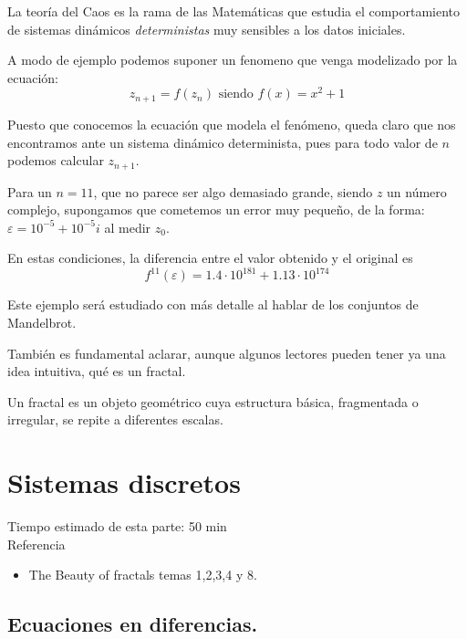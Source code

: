 \begin{definition}
La teoría del Caos es la rama de las Matemáticas que estudia el comportamiento de sistemas dinámicos \emph{deterministas} muy sensibles a los datos iniciales.
\end{definition}



\begin{example}
A modo de ejemplo podemos suponer un fenomeno que venga modelizado por la ecuación:
\[z_{n+1} = f(z_n) \text{ siendo } f(x) = x^2+1\]

Puesto que conocemos la ecuación que modela el fenómeno, queda claro que nos encontramos ante un sistema dinámico determinista, pues para todo valor de $n$ podemos calcular $z_{n+1}$.

Para un $n=11$, que no parece ser algo demasiado grande, siendo $z$ un número complejo, supongamos que cometemos un error muy pequeño, de la forma: $ε=10^{-5}+10^{-5}i$ al medir $z_0$.

En estas condiciones, la diferencia entre el valor obtenido y el original es
\[f^{11}(ε)=1.4 \cdot 10^{181} + 1.13\cdot 10^{174}\]

Este ejemplo será estudiado con más detalle al hablar de los conjuntos de Mandelbrot.
\end{example}

También es fundamental aclarar, aunque algunos lectores pueden tener ya una idea intuitiva, qué es un fractal.

\begin{definition}[Fractal]
Un fractal es un objeto geométrico cuya estructura básica, fragmentada o irregular, se repite a diferentes escalas.
\end{definition}

\section{Sistemas discretos}
Tiempo estimado de esta parte: 50 min\\
Referencia
\begin{itemize}
\item The Beauty of fractals temas 1,2,3,4 y 8.
\end{itemize}


\subsection{Ecuaciones en diferencias.}

